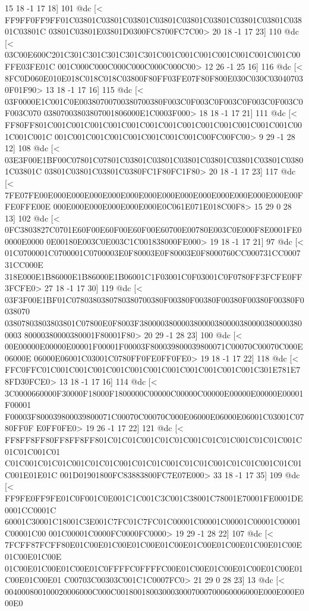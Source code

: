 	 15 18 -1 17 18] 101 @dc
[<
FF9FF0FF9FF01C03801C03801C03801C03801C03801C03801C03801C03801C03801C03801C
03801C03801E03801D0300FC8700FC7C00>
	 20 18 -1 17 23] 110 @dc
[<
03C00E600C201C301C301C301C301C301C001C001C001C001C001C001C001C00FFE03FE01C
001C000C000C000C000C000C000C00>
	 12 26 -1 25 16] 116 @dc
[<
8FC0D060E010E018C018C018C03800F80FF03FE07F80F800E030C030C030407030F01F90>
	 13 18 -1 17 16] 115 @dc
[<
03F0000E1C001C0E00380700700380700380F003C0F003C0F003C0F003C0F003C0F003C070
03807003803807001806000E1C0003F000>
	 18 18 -1 17 21] 111 @dc
[<
FF80FF801C001C001C001C001C001C001C001C001C001C001C001C001C001C001C001C001C
001C001C001C001C001C001C001C001C00FC00FC00>
	 9 29 -1 28 12] 108 @dc
[<
03E3F00E1BF00C07801C07801C03801C03801C03801C03801C03801C03801C03801C03801C
03801C03801C03801C0380FC1F80FC1F80>
	 20 18 -1 17 23] 117 @dc
[<
7FE07FE00E000E000E000E000E000E000E000E000E000E000E000E000E000E00FFE0FFE00E
000E000E000E000E000E000E0C061E071E018C00F8>
	 15 29 0 28 13] 102 @dc
[<
0FC3803827C0701E60F00E60F00E60F00E60700E00780E003C0E000F8E0001FE00000E0000
0E00180E003C0E003C1C001838000FE000>
	 19 18 -1 17 21] 97 @dc
[<
01C0700001C0700001C0700003E0F80003E0F80003E0F8000760CC000731CC000731CC000E
318E000E1B86000E1B86000E1B06001C1F03001C0F03001C0F0780FF3FCFE0FF3FCFE0>
	 27 18 -1 17 30] 119 @dc
[<
03F3F00E1BF01C0780380380780380700380F00380F00380F00380F00380F00380F0038070
03807803803803801C07800E0F8003F3800003800003800003800003800003800003800003
80000380000380001F80001F80>
	 20 29 -1 28 23] 100 @dc
[<
00E00000E00000E00001F00001F00003F800039800039800071C00070C00070C000E06000E
06000E06001C03001C0780FF0FE0FF0FE0>
	 19 18 -1 17 22] 118 @dc
[<
FFC0FFC01C001C001C001C001C001C001C001C001C001C001C001C301E781E78FD30FCE0>
	 13 18 -1 17 16] 114 @dc
[<
3C0000660000F30000F18000F1800000C00000C00000C00000E00000E00000E00001F00001
F00003F800039800039800071C00070C00070C000E06000E06000E06001C03001C0780FF0F
E0FF0FE0>
	 19 26 -1 17 22] 121 @dc
[<
FF8FF8FF80FF8FF8FF801C01C01C001C01C01C001C01C01C001C01C01C001C01C01C001C01
C01C001C01C01C001C01C01C001C01C01C001C01C01C001C01C01C001C01C01C001E01E01C
001D01901800FC83883800FC7E07E000>
	 33 18 -1 17 35] 109 @dc
[<
FF9FE0FF9FE01C0F001C0E001C1C001C3C001C38001C78001E70001FE0001DE0001CC0001C
60001C30001C18001C3E001C7FC01C7FC01C00001C00001C00001C00001C00001C00001C00
001C00001C0000FC0000FC0000>
	 19 29 -1 28 22] 107 @dc
[<
7FCFF87FCFF80E01C00E01C00E01C00E01C00E01C00E01C00E01C00E01C00E01C00E01C00E
01C00E01C00E01C00E01C0FFFFC0FFFFC00E01C00E01C00E01C00E01C00E01C00E01C00E01
C00703C00303C001C1C0007FC0>
	 21 29 0 28 23] 13 @dc
[<
004000800100020006000C000C0018001800300030007000700060006000E000E000E000E0
